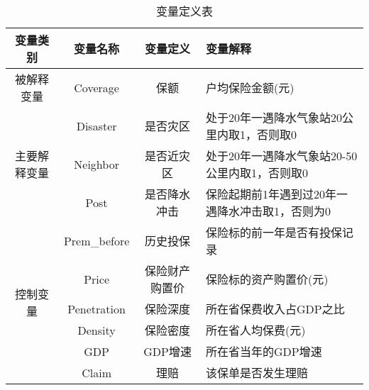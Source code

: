 \begin{table}[H]
    \caption{变量定义表}\label{tab:var}
    \centering
    \begin{tabularx}{\textwidth}{
        ccc>{\centering\arraybackslash}X
         }
        \toprule
        变量类别                    & 变量名称         & 变量定义    & 变量解释                \\ \midrule
        被解释变量                   & Coverage     & 保额      & 户均保险金额(元)              \\ \midrule
        \multirow{3}{*}{主要解释变量} & Disaster     & 是否灾区      & 处于20年一遇降水气象站20公里内取1，否则取0    \\ \cmidrule(l){2-4}
                                & Neighbor     & 是否近灾区     & 处于20年一遇降水气象站20-50公里内取1，否则取0 \\ \cmidrule(l){2-4}
                                & Post         & 是否降水冲击  & 保险起期前1年遇到过20年一遇降水冲击取1，否则为0 \\
        \midrule
        \multirow{6}{*}{控制变量}   & Prem\_before & 历史投保    & 保险标的前一年是否有投保记录         \\ \cmidrule(l){2-4}
                                & Price        & 保险财产购置价 & 保险标的资产购置价(元)           \\ \cmidrule(l){2-4}
                                & Penetration         & 保险深度    & 所在省保费收入占GDP之比            \\ \cmidrule(l){2-4}
                                & Density         & 保险密度    & 所在省人均保费(元)           \\ \cmidrule(l){2-4}
                                & GDP         & GDP增速    & 所在省当年的GDP增速           \\ \cmidrule(l){2-4}
        & Claim       & 理赔    & 该保单是否发生理赔            \\
        \bottomrule
    \end{tabularx}
\end{table}
